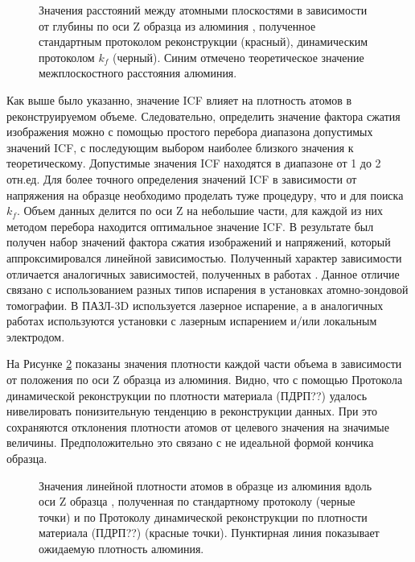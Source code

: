 \begin{figure}[htb]
	\caption{Значения расстояний между атомными плоскостями в зависимости от глубины по оси Z образца из алюминия \cite{scbibDensity}, полученное стандартным протоколом реконструкции (красный), динамическим протоколом $k_f$ (черный). Синим отмечено теоретическое значение межплоскостного расстояния алюминия.}
	\label{fig:p3_PlanesDistance_depth}
\end{figure}

Как выше было указанно, значение ICF влияет на плотность атомов в реконструируемом объеме. Следовательно, определить значение фактора сжатия изображения можно с помощью простого перебора диапазона допустимых значений ICF, с последующим выбором наиболее близкого значения к теоретическому. Допустимые значения ICF находятся в диапазоне от 1 до 2 отн.ед. Для более точного определения значений ICF в зависимости от напряжения на образце необходимо проделать туже процедуру, что и для поиска $k_f$. Объем данных делится по оси Z на небольшие части, для каждой из них методом перебора находится оптимальное значение ICF. В результате был получен набор значений фактора сжатия изображений и напряжений, который аппроксимировался линейной зависимостью. Полученный характер зависимости отличается аналогичных зависимостей, полученных в работах \cite{Hatzoglou19, Gault11_Loi}. Данное отличие связано с использованием разных типов испарения в установках атомно-зондовой томографии. В ПАЗЛ-3D используется лазерное испарение, а в аналогичных работах используются установки с лазерным испарением и/или локальным электродом.

На Рисунке \cref{fig:p3_Density_vs_depth} показаны значения плотности каждой части объема в зависимости от положения по оси Z образца из алюминия. Видно, что с помощью Протокола динамической реконструкции по плотности материала (ПДРП??) удалось нивелировать понизительную тенденцию в реконструкции данных. При это сохраняются отклонения плотности атомов от целевого значения на значимые величины. Предположительно это связано с не идеальной формой кончика образца.

\begin{figure}[htb]
	\caption{Значения линейной плотности атомов в образце из алюминия вдоль оси Z образца \cite{scbibDensity}, полученная по стандартному протоколу (черные точки) и по Протоколу динамической реконструкции по плотности материала (ПДРП??) (красные точки). Пунктирная линия показывает ожидаемую плотность алюминия.}
	\label{fig:p3_Density_vs_depth}
\end{figure}

